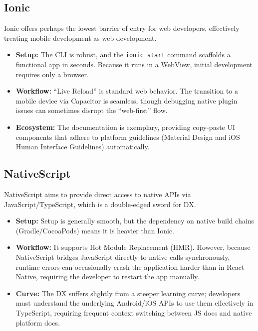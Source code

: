 \subsection{Ionic}
Ionic offers perhaps the lowest barrier of entry for web developers, effectively treating mobile development as web development.
\begin{itemize}
    \item \textbf{Setup:} The CLI is robust, and the \texttt{ionic start} command scaffolds a functional app in seconds. Because it runs in a WebView, initial development requires only a browser.\\\cite{DX:ION:01}
    \item \textbf{Workflow:} ``Live Reload'' is standard web behavior. The transition to a mobile device via Capacitor is seamless, though debugging native plugin issues can sometimes disrupt the ``web-first'' flow.~\cite{DX:ION:02}
    \item \textbf{Ecosystem:} The documentation is exemplary, providing copy-paste UI components that adhere to platform guidelines (Material Design and iOS Human Interface Guidelines) automatically.~\cite{DX:ION:03}
\end{itemize}

\subsection{NativeScript}
NativeScript aims to provide direct access to native APIs via JavaScript/TypeScript, which is a double-edged sword for DX\@.
\begin{itemize}
    \item \textbf{Setup:} Setup is generally smooth, but the dependency on native build chains (Gradle/CocoaPods) means it is heavier than Ionic.~\cite{DX:NS:01}
    \item \textbf{Workflow:} It supports Hot Module Replacement (HMR\@). However, because NativeScript bridges JavaScript directly to native calls synchronously, runtime errors can occasionally crash the application harder than in React Native, requiring the developer to restart the app manually.~\cite{DX:NS:02}
    \item \textbf{Curve:} The DX suffers slightly from a steeper learning curve; developers must understand the underlying Android/iOS APIs to use them effectively in TypeScript, requiring frequent context switching between JS docs and native platform docs.
\end{itemize}

